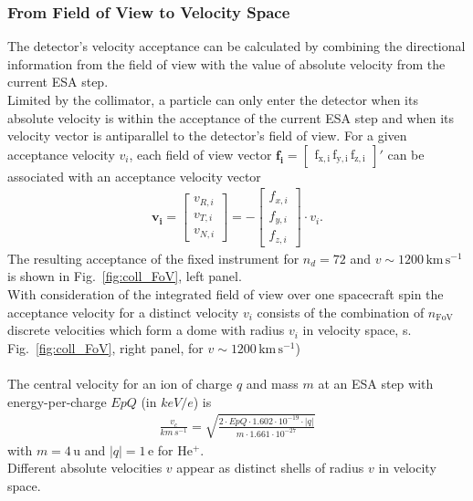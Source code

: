\subsubsection{From Field of View to Velocity Space}
The detector's velocity acceptance can be calculated by combining the directional information from the field of view with the value of absolute velocity from the current ESA step. 
\\
Limited by the collimator, a particle can only enter the detector when its absolute velocity is within the acceptance of the current ESA step and when its velocity vector is antiparallel to the detector's field of view. For a given acceptance velocity $v_i$, each field of view vector $\mathrm{\mathbf{f_i} = \begin{bmatrix}f_{x,i}\,f_{y,i}\,f_{z,i}\end{bmatrix}}'$ can be associated with an acceptance velocity vector
\begin{align}
\mathbf{v_i} = \begin{bmatrix}v_{R,i}\\v_{T,i}\\v_{N,i}\end{bmatrix} = - \begin{bmatrix}f_{x,i}\\f_{y,i}\\f_{z,i}\end{bmatrix} \cdot v_i.
\label{eq:fov}
\end{align}
The resulting acceptance of the fixed instrument for $n_d = 72$ and $v \sim 1200\,\mathrm{km\,s^{-1}}$ is shown in Fig.~\ref{fig:coll_FoV}, left panel. \\
With consideration of the integrated field of view over one spacecraft spin the acceptance velocity for a distinct velocity $v_i$ consists of the combination of $n_\mathrm{FoV}$ discrete velocities which form a dome with radius $v_i$ in velocity space, s. Fig.~\ref{fig:coll_FoV}, right panel, for $v \sim 1200\,\mathrm{km\,s^{-1}}$)
\\ \\
The central velocity for an ion of charge $q$ and mass $m$ at an ESA step with energy-per-charge $EpQ$ (in $keV/e$) is
\begin{align*}
\frac{v_c}{km \, s^{-1}} = \sqrt{\frac{2 \cdot EpQ \cdot 1.602\cdot10^{-19}\cdot |q|}{m \cdot 1.661 \cdot 10^{-27}} }
\end{align*}
with $m = 4\,\mathrm{u}$ and $|q| = 1\,\mathrm{e}$ for $\mathrm{He^{+}}$.
\\
Different absolute velocities $v$ appear as distinct shells of radius $v$ in velocity space.
